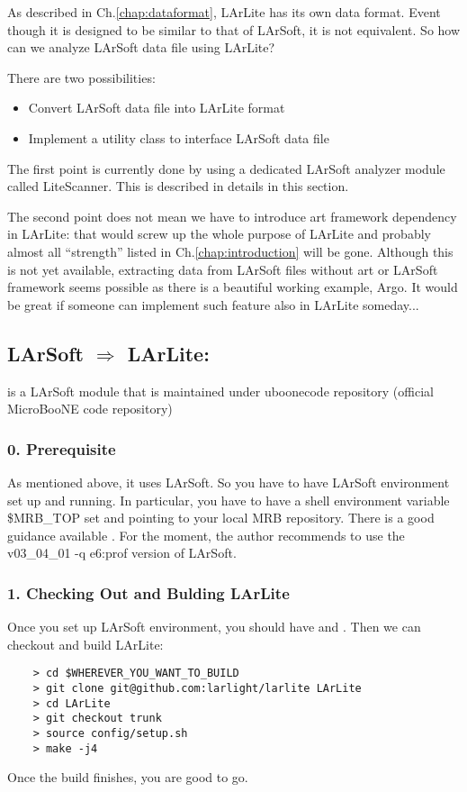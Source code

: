 As described in Ch.\ref{chap:dataformat}, LArLite has its own data format.
Event though it is designed to be similar to that of LArSoft, it is not equivalent.
So how can we analyze LArSoft data file using LArLite?

There are two possibilities:
\begin{itemize}
\item Convert LArSoft data file into LArLite format
\item Implement a utility class to interface LArSoft data file
\end{itemize}
The first point is currently done by using a dedicated LArSoft analyzer module called {\ttfamily LiteScanner}. This is described in details in this section.

The second point does not mean we have to introduce {\ttfamily art} framework dependency in LArLite: that would screw up the whole purpose of LArLite and probably almost all ``strength'' listed in Ch.\ref{chap:introduction} will be gone. Although this is not yet available, extracting data from LArSoft files without {\ttfamily art} or LArSoft framework seems possible as there is a beautiful working example, {\ttfamily Argo}. It would be great if someone can implement such feature also in LArLite someday...

\subsection{LArSoft $\Rightarrow$ LArLite: \LiteScanner}
 \LiteScanner is a LArSoft module that is maintained under {\ttfamily uboonecode} repository (official MicroBooNE code repository)

\subsubsection{0. Prerequisite}
As mentioned above, it uses LArSoft. So you have to have LArSoft environment set up and running. In particular, you have to have a shell environment variable {\ttfamily \$MRB\_TOP} set and pointing to your local MRB repository. There is a good guidance available \cite{LArDevWiki}. For the moment, the author recommends to use the {\ttfamily v03\_04\_01 -q e6:prof} version of {\ttfamily LArSoft}.

\subsubsection{1. Checking Out and Bulding LArLite}
Once you set up LArSoft environment, you should have \git and \ROOT. Then we can checkout and build LArLite:
\begin{lstlisting}
    > cd $WHEREVER_YOU_WANT_TO_BUILD
    > git clone git@github.com:larlight/larlite LArLite
    > cd LArLite
    > git checkout trunk
    > source config/setup.sh
    > make -j4
\end{lstlisting}
Once the build finishes, you are good to go.


